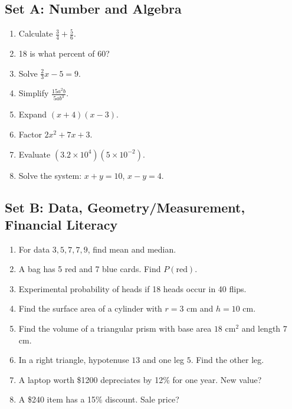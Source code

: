 \documentclass[12pt,oneside]{article}
\newcommand{\ws}[1]{\vspace*{#1}}
\begin{document}
\subsection{Set A: Number and Algebra}
\begin{enumerate}
  \item Calculate $\frac{3}{4}+\frac{5}{6}$. \ws{1.6cm}
  \item 18 is what percent of 60? \ws{1.3cm}
  \item Solve $\frac{2}{3}x-5=9$. \ws{1.6cm}
  \item Simplify $\frac{15a^2b}{5ab^3}$. \ws{1.6cm}
  \item Expand $(x+4)(x-3)$. \ws{1.5cm}
  \item Factor $2x^2+7x+3$. \ws{1.6cm}
  \item Evaluate $(3.2\times10^4)(5\times10^{-2})$. \ws{1.7cm}
  \item Solve the system: $x+y=10$, $x-y=4$. \ws{1.8cm}
\end{enumerate}

\subsection{Set B: Data, Geometry/Measurement, Financial Literacy}
\begin{enumerate}
  \item For data $3,5,7,7,9$, find mean and median. \ws{1.7cm}
  \item A bag has 5 red and 7 blue cards. Find $P(\text{red})$. \ws{1.4cm}
  \item Experimental probability of heads if 18 heads occur in 40 flips. \ws{1.4cm}
  \item Find the surface area of a cylinder with $r=3$ cm and $h=10$ cm. \ws{1.8cm}
  \item Find the volume of a triangular prism with base area $18$ cm$^2$ and length $7$ cm. \ws{1.8cm}
  \item In a right triangle, hypotenuse $13$ and one leg $5$. Find the other leg. \ws{1.8cm}
  \item A laptop worth \$1200 depreciates by 12\% for one year. New value? \ws{1.8cm}
  \item A \$240 item has a 15\% discount. Sale price? \ws{1.5cm}
\end{enumerate}
\end{document}
